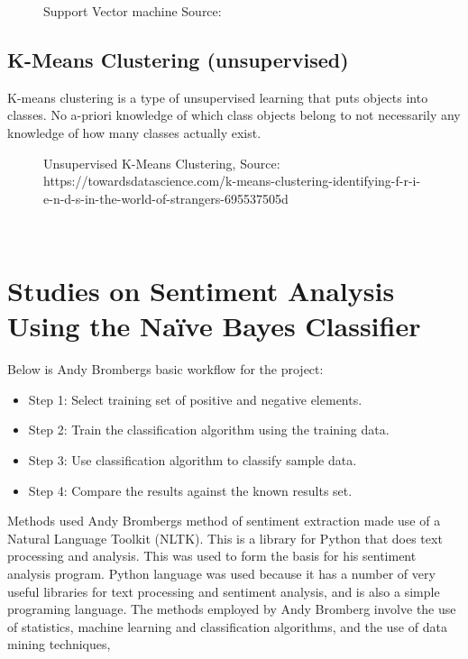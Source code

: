 \begin{figure}[h]
  \centering
  \caption[Support vector machine]%
  {Support Vector machine Source:\cite{ref28}}
  \label{fig:ALAP:sm3}
\end{figure}

\clearpage
\subsection{K-Means Clustering (unsupervised)}
K-means clustering is a type of unsupervised learning that puts objects into classes. No a-priori
knowledge of which class objects belong to not necessarily any knowledge of how many classes
actually exist.

\begin{figure}[h]
  \centering
  \caption[K-means clustering]%
  {Unsupervised K-Means Clustering, Source: https://towardsdatascience.com/k-means-clustering-identifying-f-r-i-e-n-d-s-in-the-world-of-strangers-695537505d}
  \label{fig:ALAP:sm3}
\end{figure}

\leavevmode\\
\section{Studies on Sentiment Analysis Using the Naïve Bayes Classifier}
Below is Andy Bromberg\textquotesingle s basic workflow for the project:
\begin{itemize}
\item Step 1: Select training set of positive and negative elements.
\item Step 2: Train the classification algorithm using the training data.
\item Step 3: Use classification algorithm to classify sample data.
\item Step 4: Compare the results against the known results set.
\end{itemize}
Methods used
Andy Bromberg\textquotesingle s method of sentiment extraction made use of a Natural Language Toolkit
(NLTK). This is a library for Python that does text processing and analysis. This was used to form
the basis for his sentiment analysis program. Python language was used because it has a number
of very useful libraries for text processing and sentiment analysis, and is also a simple programing
language. The methods employed by Andy Bromberg involve the use of statistics, machine
learning and classification algorithms, and the use of data mining techniques, \cite{ref31}

